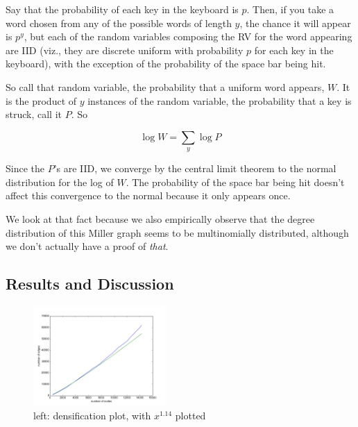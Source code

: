 \documentclass[12pt]{article}
\begin{document}
Say that the probability of each key in the keyboard is $p$. Then, if you take a word chosen from any of the possible words of length $y$, the chance it will appear is $p^y$, but each of the random variables composing the RV for the word appearing are IID (viz., they are discrete uniform with probability $p$ for each key in the keyboard), with the exception of the probability of the space bar being hit.

So call that random variable, the probability that a uniform word appears, $W$. It is the product of $y$ instances of the random variable, the probability that a key is struck, call it $P$. So

$$ \log W = \sum_y \log P $$

Since the $P$'s are IID, we converge by the central limit theorem to the normal distribution for the log of $W$. The probability of the space bar being hit doesn't affect this convergence to the normal because it only appears once.

We look at that fact because we also empirically observe that the degree distribution of this Miller graph seems to be multinomially distributed, although we don't actually have a proof of \emph{that}.



\subsection{Results and Discussion}



\begin{figure}
  \includegraphics[width=0.45\textwidth]{densification_plot.png}
  \caption{left: densification plot, with $x^{1.14}$ plotted}
\end{figure}
\end{document}
